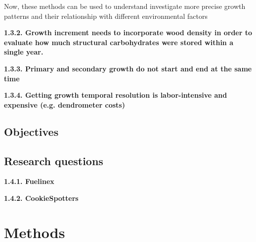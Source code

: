 \documentclass{article}
\begin{document}
Now, these methods can be used to understand investigate more precise growth patterns and their relationship with different environmental factors

\textbf{1.3.2. Growth increment needs to incorporate wood density in order to evaluate how much structural carbohydrates were stored within a single year.}

\textbf{1.3.3. Primary and secondary growth do not start and end at the same time}

\textbf{1.3.4. Getting growth temporal resolution is labor-intensive and expensive (e.g. dendrometer costs)}




\subsection{Objectives} 

\subsection {Research questions} 

\textbf{1.4.1. Fuelinex}

\textbf{1.4.2. CookieSpotters}


\section{Methods}

\end{document}
